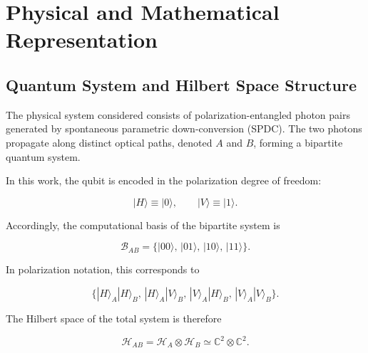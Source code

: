 
\chapter{Physical and Mathematical Representation}
\label{physical_and_mathematical_representation}


\section{Quantum System and Hilbert Space Structure}

The physical system considered consists of polarization-entangled photon pairs generated by spontaneous parametric down-conversion (SPDC). The two photons propagate along distinct optical paths, denoted \( A \) and \( B \), forming a bipartite quantum system.

\medskip

In this work, the qubit is encoded in the polarization degree of freedom:

\begin{equation}
|H\rangle \equiv |0\rangle,
\qquad
|V\rangle \equiv |1\rangle.
\label{eq:polarization_computational_encoding}
\end{equation}

Accordingly, the computational basis of the bipartite system is

\begin{equation}
\mathcal{B}_{AB}
=
\{
|00\rangle,\,
|01\rangle,\,
|10\rangle,\,
|11\rangle
\}.
\label{eq:two_qubit_computational_basis}
\end{equation}

In polarization notation, this corresponds to

\[
\{
|H\rangle_A |H\rangle_B,\,
|H\rangle_A |V\rangle_B,\,
|V\rangle_A |H\rangle_B,\,
|V\rangle_A |V\rangle_B
\}.
\]

\medskip

The Hilbert space of the total system is therefore

\begin{equation}
\mathcal{H}_{AB}
=
\mathcal{H}_A \otimes \mathcal{H}_B
\simeq
\mathbb{C}^{2} \otimes \mathbb{C}^{2}.
\label{eq:two_qubit_hilbert_space}
\end{equation}

